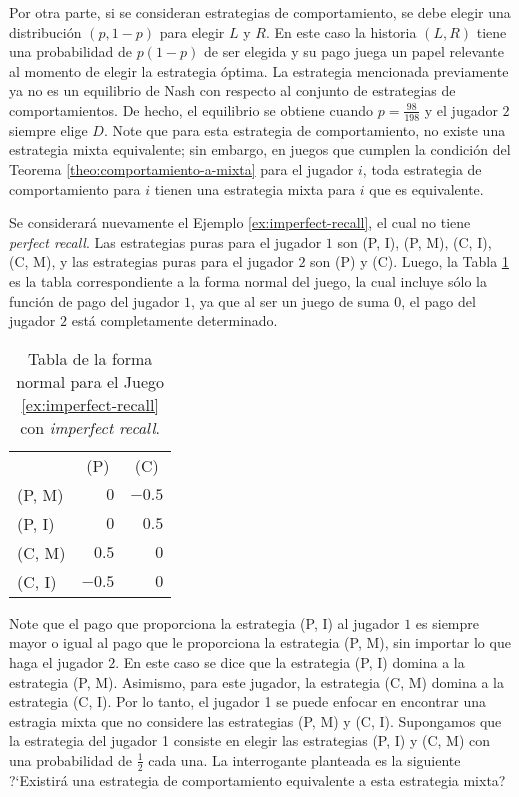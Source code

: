 Por otra parte, si se consideran estrategias de comportamiento, se debe elegir una distribución $(p, 1-p)$ para elegir $L$ y $R$. En este caso la historia $(L, R)$ tiene una probabilidad de $p(1-p)$ de ser elegida y su pago juega un papel relevante al momento de elegir la estrategia óptima. La estrategia mencionada previamente ya no es un equilibrio de Nash con respecto al conjunto de estrategias de comportamientos. De hecho, el equilibrio se obtiene cuando $p = \frac{98}{198}$ y el jugador $2$ siempre elige $D$.
Note que para esta estrategia de comportamiento, no existe una estrategia mixta equivalente; sin embargo, en juegos que cumplen la condición del Teorema \ref{theo:comportamiento-a-mixta} para el jugador $i$, toda estrategia de comportamiento para $i$ tienen una estrategia mixta para $i$ que es equivalente.


Se considerará nuevamente el Ejemplo \ref{ex:imperfect-recall}, el cual no tiene \textit{perfect recall}. Las estrategias puras para el jugador $1$ son (P, I), (P, M), (C, I), (C, M), y las estrategias puras para el jugador $2$ son (P) y (C). Luego, la Tabla \ref{table:imperfect-recall} es la tabla correspondiente a la forma normal del juego, la cual incluye sólo la función de pago del jugador $1$, ya que al ser un juego de suma $0$, el pago del jugador $2$ está completamente determinado.

\begin{table}[h]
\begin{center}
\caption[Tabla de la forma normal para un juego con \textit{imperfect recall}]{Tabla de la forma normal para el Juego \ref{ex:imperfect-recall} con \textit{imperfect recall}.}
\label{table:imperfect-recall}
\begin{tabular}{l | r | r |}
\multicolumn{1}{c}{} & \multicolumn{1}{c}{(P)} & \multicolumn{1}{c}{(C)} \\ \cline{2-3}
(P, M)     & $0$ & $-0.5$ \\ \cline{2-3}
(P, I) & $0$ & $0.5$ \\ \cline{2-3}
(C, M)     & $0.5$ & $0$ \\ \cline{2-3}
(C, I) & $-0.5$ & $0$ \\ \cline{2-3}
\end{tabular}
\end{center}
\end{table}

Note que el pago que proporciona la estrategia (P, I) al jugador $1$ es siempre mayor o igual al pago que le proporciona la estrategia (P, M), sin importar lo que haga el jugador $2$. En este caso se dice que la estrategia (P, I) domina a la estrategia (P, M). Asimismo, para este jugador, la estrategia (C, M) domina a la estrategia (C, I). Por lo tanto, el jugador 1 se puede enfocar en encontrar una estragia mixta que no considere las estrategias (P, M) y (C, I). Supongamos que la estrategia del jugador 1 consiste en elegir las estrategias (P, I) y (C, M) con una probabilidad de $\frac{1}{2}$ cada una. La interrogante planteada es la siguiente ?`Existirá una estrategia de comportamiento equivalente a esta estrategia mixta?

